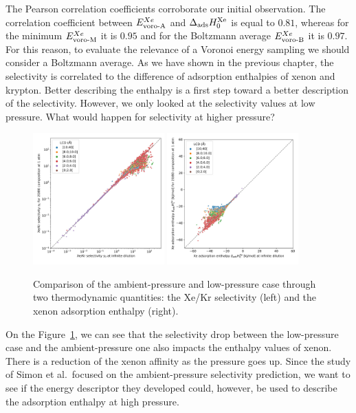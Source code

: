 \documentclass[main]{subfiles}
\begin{document}
The Pearson correlation coefficients corroborate our initial observation. The correlation coefficient between $E_{\text{voro-A}}^{Xe}$ and $\Delta_{\text{ads}} H_{0}^{\text{Xe}}$ is equal to $0.81$, whereas for the minimum $E_{\text{voro-M}}^{Xe}$ it is $0.95$ and for the Boltzmann average $E_{\text{voro-B}}^{Xe}$ it is $0.97$. For this reason, to evaluate the relevance of a Voronoi energy sampling we should consider a Boltzmann average. As we have shown in the previous chapter, the selectivity is correlated to the difference of adsorption enthalpies of xenon and krypton. Better describing the enthalpy is a first step toward a better description of the selectivity. However, we only looked at the selectivity values at low pressure. What would happen for selectivity at higher pressure?

\begin{figure}[ht]
  \centering
  \includegraphics[width=0.45\textwidth]{figures/3-fastsim/s_0_vs_s_2080_overview.jpg}
  \includegraphics[width=0.45\textwidth]{figures/3-fastsim/H_Xe_0_vs_H_Xe_2080_overview.jpg}
    \caption{Comparison of the ambient-pressure and low-pressure case through two thermodynamic quantities: the Xe/Kr selectivity (left) and the xenon adsorption enthalpy (right). }\label{fgr:compa_pressure}
\end{figure}

On the Figure~\ref{fgr:compa_pressure}, we can see that the selectivity drop between the low-pressure case and the ambient-pressure one also impacts the enthalpy values of xenon. There is a reduction of the xenon affinity as the pressure goes up. Since the study of Simon et al.\ focused on the ambient-pressure selectivity prediction, we want to see if the energy descriptor they developed could, however, be used to describe the adsorption enthalpy at high pressure. 
\end{document}
